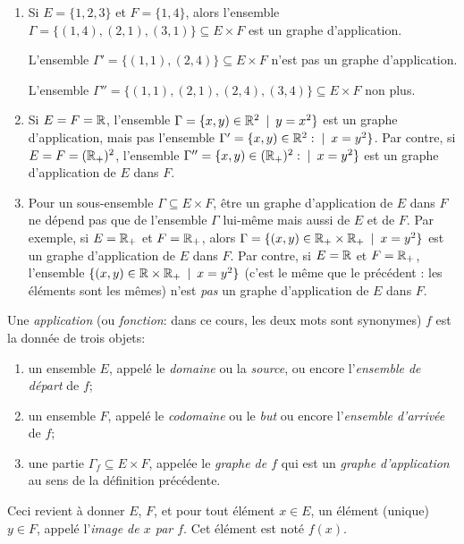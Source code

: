 \begin{exemple}
\begin{enumerate}
\item Si $E = \{1,2,3\}$ et $F = \{1,4\}$, alors l'ensemble $\Gamma = \{(1,4),(2,1),(3,1)\} \subseteq E\times F$ est un graphe d'application.

L'ensemble $\Gamma' = \{(1,1),(2,4)\} \subseteq E\times F$ n'est pas un graphe d'application.

L'ensemble $\Gamma'' = \{(1,1),(2,1),(2,4),(3,4)\} \subseteq E\times F$ non plus.
\item Si $E = F = \mathbb{R}$, l'ensemble $\Gamma = \{x,y)\in \R^2 \:\mid\: y=x^2\}$ est un graphe d'application, mais pas l'ensemble $\Gamma' = \{x,y)\in \R^2 :\mid\: x=y^2\}$. Par contre, si $E=F=(\mathbb{R}_+)^2$, l'ensemble  $\Gamma'' = \{x,y)\in (\R_+)^2 :\mid\: x=y^2\}$ est un graphe d'application de $E$ dans $F$.
\item Pour un sous-ensemble $\Gamma\subseteq E\times F$, être un graphe d'application de $E$ dans $F$ ne dépend pas que de l'ensemble $\Gamma$ lui-même mais aussi de $E$ et de $F$. Par exemple, si $E=\mathbb{R}_+$ et $F=\mathbb{R}_+$, alors $\Gamma = \{(x,y)\in \R_+\times \R_+ \:\mid\: x=y^2\}$ est un graphe d'application de $E$ dans $F$. Par contre, si $E=\mathbb{R}$ et $F=\mathbb{R}_+$, l'ensemble $\{(x,y)\in \R\times \R_+ \:\mid\: x=y^2\}$ (c'est le même que le précédent : les éléments sont les mêmes) n'est \emph{pas} un graphe d'application de $E$ dans $F$.
\end{enumerate}
\end{exemple}

\begin{definition}
Une \emph{application} (ou \emph{fonction}: dans ce cours, les deux mots sont synonymes) $f$ est la donnée de trois objets:
\begin{enumerate}
\item un ensemble $E$, appelé le \emph{domaine} ou la \emph{source}, ou encore l'\emph{ensemble de départ} de $f$;
\item un ensemble $F$, appelé le \emph{codomaine} ou le \emph{but} ou encore l'\emph{ensemble d'arrivée} de $f$;
\item une partie $\Gamma_f \subseteq E\times F$, appelée le \emph{graphe de $f$} qui est un \emph{graphe d'application} au sens de la définition précédente. 
\end{enumerate}
Ceci revient à donner $E$, $F$, et pour tout élément $x \in E$, un élément (unique) $y\in F$, appelé l'\emph{image de $x$ par $f$}. Cet élément est noté $f(x)$.
\end{definition}


